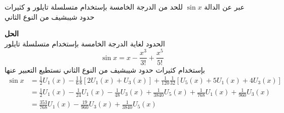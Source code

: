 \begin{example}
	عبر عن الدالة $\sin x$ للحد من الدرجة الخامسة بإستخدام متسلسلة تايلور و كثيرات حدود شيبشيف من النوع الثاني
\end{example}
\noindent
\textbf{الحل}\\
\noindent
الحدود لغاية الدرجة الخامسة بإستخدام متسلسلة تايلور 
\[
\sin x = x - \frac{x^3}{3!} + \frac{x^5}{5!}
\]
بإستخدام كثيرات حدود شيبشيف من النوع الثاني نستطيع التعبير عنها
\begin{align*}
	\sin x &= \frac{1}{2} U_1(x) - \frac{1}{6}\frac{1}{8}[2U_1(x) + U_3(x)] + \frac{1}{120}\frac{1}{32}[U_5(x) + 5U_1(x) + 4U_3(x)]\\
	&= \frac{1}{2}U_1(x) - \frac{1}{24}U_1(x) - \frac{1}{48}U_3(x) + \frac{1}{3840}U_5(x)  + \frac{1}{768} U_1(x) + \frac{1}{960} U_3(x)\\
	&= \frac{353}{768} U_1(x) - \frac{19}{960}U_3(x) + \frac{1}{3840} U_5(x)
\end{align*}


